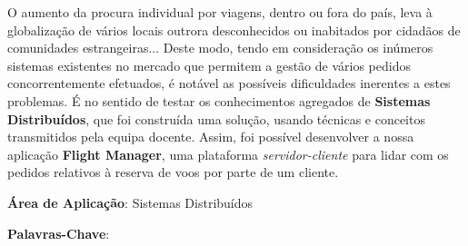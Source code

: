 \documentclass[a4paper,11pt]{scrreprt}
\begin{document}

\makecover


\renewenvironment{abstract}
{\par\noindent\textbf{\Large\abstractname}\par\bigskip}
{}

\begin{flushleft}
    \begin{abstract}
        O aumento da procura individual por viagens, dentro ou fora do país, leva à globalização 
        de vários locais outrora desconhecidos ou inabitados por cidadãos de comunidades estrangeiras...
        Deste modo, tendo em consideração os inúmeros sistemas existentes no mercado que permitem 
        a gestão de vários pedidos concorrentemente efetuados, é notável as possíveis dificuldades
        inerentes a estes problemas. 
        É no sentido de testar os conhecimentos agregados de \textbf{Sistemas Distribuídos}, que foi 
        construída uma solução, usando técnicas e conceitos transmitidos pela equipa docente.
        Assim, foi possível desenvolver a nossa aplicação \textbf{Flight Manager}, uma plataforma
        \textit{servidor-cliente} para lidar com os pedidos relativos à reserva de voos por parte de um cliente.
        \par \textbf{Área de Aplicação}: Sistemas Distribuídos
        \par \textbf{Palavras-Chave}: 
    \end{abstract}
\end{flushleft}

\pagebreak



\end{document}
